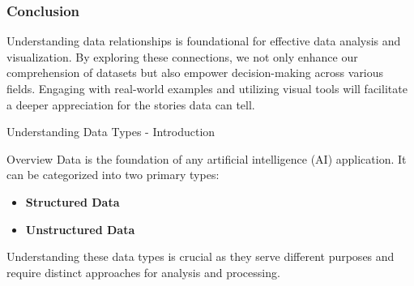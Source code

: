 \documentclass[aspectratio=169]{beamer}
\begin{document}
\begin{frame}[fragile]
    \frametitle{Conclusion}
    Understanding data relationships is foundational for effective data analysis and visualization. By exploring these connections, we not only enhance our comprehension of datasets but also empower decision-making across various fields. Engaging with real-world examples and utilizing visual tools will facilitate a deeper appreciation for the stories data can tell. 
\end{frame}

\begin{frame}[fragile]{Understanding Data Types - Introduction}
    \begin{block}{Overview}
        Data is the foundation of any artificial intelligence (AI) application. It can be categorized into two primary types:
        \begin{itemize}
            \item \textbf{Structured Data}
            \item \textbf{Unstructured Data}
        \end{itemize}
        Understanding these data types is crucial as they serve different purposes and require distinct approaches for analysis and processing.
    \end{block}
\end{frame}
\end{document}
